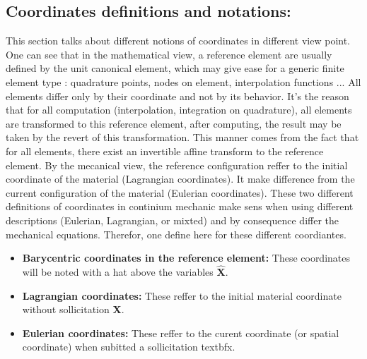 \documentclass[a4paper,10pt]{article}
\begin{document}
\subsection{Coordinates definitions and notations: }
This section talks about different notions of coordinates in different view point. One can see that in the mathematical view, a reference element are usually defined by the unit canonical element, which may give ease for a generic finite element type : quadrature points, nodes on element, interpolation functions ... All elements differ only by their coordinate and not by its behavior. It's the reason that for all computation (interpolation, integration on quadrature), all elements are transformed to this reference element, after computing, the result may be taken by the revert of this transformation. This manner comes from the fact that for all elements, there exist an invertible affine transform to the reference element. By the mecanical view, the reference configuration reffer to the initial coordinate of the material (Lagrangian coordinates). It make difference from the current configuration of the material (Eulerian coordinates). These two different definitions of coordinates in continium mechanic make sens when using different descriptions (Eulerian, Lagrangian, or mixted) and by consequence differ the mechanical equations. Therefor, one define here for these different coordiantes. 
\begin{itemize}
 \item \textbf{Barycentric coordinates in the reference element: }These coordinates will be noted with a hat above the variables $\hat{\textbf{X}}$.
 \item \textbf{Lagrangian coordinates: }These reffer to the initial material coordinate without sollicitation \textbf{X}.
 \item \textbf{Eulerian coordinates: }These reffer to the curent coordinate (or spatial coordinate) when subitted a sollicitation textbf{x}.
\end{itemize}
\end{document}
